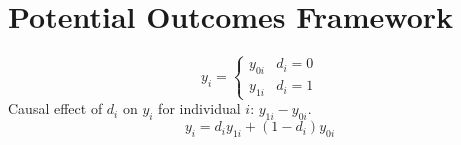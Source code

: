 \section{Potential Outcomes Framework}
\[y_i = \left\{\begin{matrix}
   y_{0i} & d_i=0\\
   y_{1i} & d_i=1
  \end{matrix}\right.
\]
Causal effect of $d_i$ on $y_i$ for individual $i$: $y_{1i} - y_{0i}$.
\[y_i = d_i y_{1i} + (1-d_i)y_{0i} \]